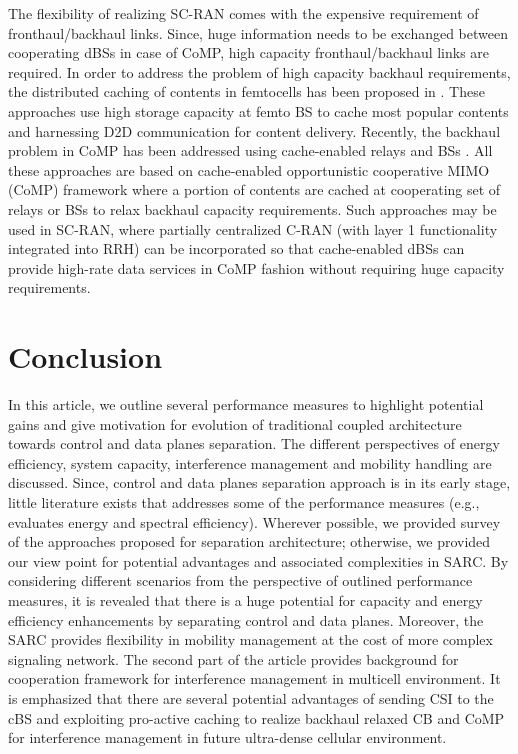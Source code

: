\documentclass[article,10pt,twocolumn]{IEEEtran}
\begin{document}
The flexibility of realizing SC-RAN comes with the expensive requirement of fronthaul/backhaul links. Since, huge information needs to be exchanged between cooperating dBSs in case of CoMP, high capacity fronthaul/backhaul links are required. In order to address the problem of high capacity backhaul requirements, the distributed caching of contents in femtocells has been proposed in \citep{6195469, 6495773}. These approaches use high storage capacity at femto BS to cache most popular contents and harnessing D2D communication for content delivery. Recently, the backhaul problem in CoMP has been addressed using cache-enabled relays and BSs \citep{6601672, 6665021, 6948325}. All these approaches are based on cache-enabled opportunistic cooperative MIMO (CoMP) framework where a portion of contents are cached at cooperating set of relays or BSs to relax backhaul capacity requirements. Such approaches may be used in SC-RAN, where partially centralized C-RAN (with layer 1 functionality integrated into RRH) can be incorporated so that cache-enabled dBSs can provide high-rate data services in CoMP fashion without requiring huge capacity requirements.
\section{Conclusion}\label{conclusion}
In this article, we outline several performance measures to highlight potential gains and give motivation for evolution of traditional coupled architecture towards control and data planes separation. The different perspectives of energy efficiency, system capacity, interference management and mobility handling are discussed. Since, control and data planes separation approach is in its early stage, little literature exists that addresses some of the performance measures (e.g., \citep{6477646, 6554746} evaluates energy and spectral efficiency). Wherever possible, we provided survey of the approaches proposed for separation architecture; otherwise, we provided our view point for potential advantages and associated complexities in SARC. By considering different scenarios from the perspective of outlined performance measures, it is revealed that there is a huge potential for capacity and energy efficiency enhancements by separating control and data planes. Moreover, the SARC provides flexibility in mobility management at the cost of more complex signaling network. The second part of the article provides background for cooperation framework for interference management in multicell environment. It is emphasized that there are several potential advantages of sending CSI to the cBS and exploiting pro-active caching to realize backhaul relaxed CB and CoMP for interference management in future ultra-dense cellular environment.
\end{document}
